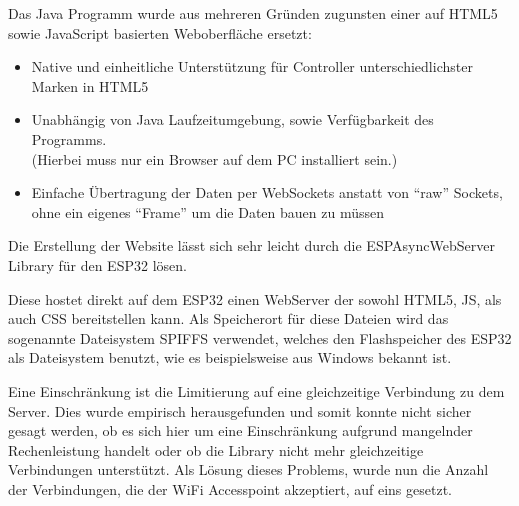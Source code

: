 Das Java Programm wurde aus mehreren Gründen zugunsten einer auf HTML5 sowie JavaScript basierten Weboberfläche ersetzt:\par

\begin{itemize}
	\item Native und einheitliche Unterstützung für Controller unterschiedlichster Marken in HTML5\par
	
	\item Unabhängig von Java Laufzeitumgebung, sowie Verfügbarkeit des Programms.\\
	(Hierbei muss nur ein Browser auf dem PC installiert sein.)\par
	
	\item Einfache Übertragung der Daten per WebSockets anstatt von ``raw''  Sockets, ohne ein eigenes ``Frame'' um die Daten bauen zu müssen
\end{itemize}\par


\vspace{\baselineskip}
Die Erstellung der Website lässt sich sehr leicht durch die ESPAsyncWebServer Library für den ESP32 lösen. \par

Diese hostet direkt auf dem ESP32 einen WebServer der sowohl HTML5, JS, als auch CSS bereitstellen kann. Als Speicherort für diese Dateien wird das sogenannte Dateisystem SPIFFS verwendet, welches den Flashspeicher des ESP32 als Dateisystem benutzt, wie es beispielsweise aus Windows bekannt ist.\par

Eine Einschränkung ist die Limitierung auf eine gleichzeitige Verbindung zu dem Server. 
Dies wurde empirisch herausgefunden und somit konnte nicht sicher gesagt werden, ob es sich hier um eine Einschränkung aufgrund mangelnder Rechenleistung handelt oder ob die Library nicht mehr gleichzeitige Verbindungen unterstützt. Als Lösung dieses Problems, wurde nun die Anzahl der Verbindungen, die der WiFi Accesspoint akzeptiert, auf eins gesetzt.\par


\vspace{\baselineskip}

